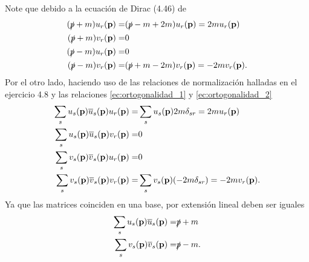 \documentclass{article}
\begin{document}
\begin{enumerate}
Note que debido a la ecuación de Dirac (4.46) de \cite{Lahiri2005}
\begin{align}
\begin{split}
(\slashed{p}+m)u_r(\vb{p})=&(\slashed{p}-m+2m)u_r(\vb{p})=2mu_r(\vb{p})\\
(\slashed{p}+m)v_r(\vb{p})=&0\\
(\slashed{p}-m)u_r(\vb{p})=&0\\
(\slashed{p}-m)v_r(\vb{p})=&(\slashed{p}+m-2m)v_r(\vb{p})=-2mv_r(\vb{p}).
\end{split}
\end{align}
Por el otro lado, haciendo uso de las relaciones de normalización halladas en el ejercicio 4.8 y las relaciones \eqref{ec:ortogonalidad_1} y \eqref{ec:ortogonalidad_2}
\begin{align}
\begin{split}
\sum_s u_s(\vb{p})\overline{u}_s(\vb{p})u_r(\vb{p})=&\sum_s u_s(\vb{p})2m\delta_{sr}=2mu_r(\vb{p})\\
\sum_s u_s(\vb{p})\overline{u}_s(\vb{p})v_r(\vb{p})=&0\\
\sum_s v_s(\vb{p})\overline{v}_s(\vb{p})u_r(\vb{p})=&0\\
\sum_s v_s(\vb{p})\overline{v}_s(\vb{p})v_r(\vb{p})=&\sum_s v_s(\vb{p})(-2m\delta_{sr})=-2mv_r(\vb{p}).
\end{split}
\end{align}
Ya que las matrices coinciden en una base, por extensión lineal deben ser iguales
\begin{align}
\begin{split}
\sum_s u_s(\vb{p})\overline{u}_s(\vb{p})=&\slashed{p}+m\\
\sum_s v_s(\vb{p})\overline{v}_s(\vb{p})=&\slashed{p}-m.
\end{split}
\end{align}


\end{enumerate}
\end{document}

